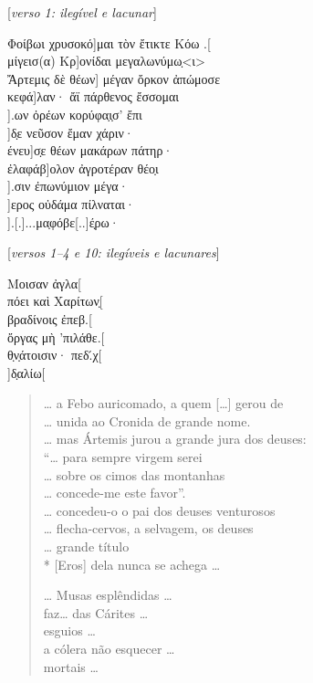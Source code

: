 \begin{gkverse}
\textnormal{[\textit{verso 1: ilegível e lacunar}]}

Φοίβωι χρυσοκό]μαι τὸν ἔτικτε Κόω .[\\
μίγεισ(α)         Κρ]ονίδαι μεγαλωνύμω̣<ι>\\
Ἄρτεμις δὲ θέων] μέγαν ὄρκον ἀπώμοσε\\
    κεφά]λαν· ἄϊ πάρθενος ἔσσομαι\\
             ].ων ὀρέων κορύφα̣ι̣σ’ ἔπι\\
    ]δ̣ε νεῦσον ἔμαν χάριν·\\
         ένευ]σ̣ε θέων μακάρων πάτηρ·\\
ἐλαφάβ]ολον ἀγροτέραν θέο̣ι\\
            ].σιν ἐπωνύμιον μέγα·\\
   ]ερος οὐδάμα πίλναται·\\
     ].[.]...μα̣φόβε[..]έ̣ρω·

\textnormal{[\textit{versos 1--4 e 10: ilegíveis e lacunares}]}

Μοισαν ἀγλα[\\
πόει καὶ Χαρίτων̣[\\
βραδίνοις ἐπεβ.[\\
ὄργας μὴ ’πιλάθε.[\\
θ̣ν̣άτοισιν· πεδ.́χ[\\
      ]δ̣αλίω[
\end{gkverse}
\pagebreak
\begin{verse}
\ldots{} a Febo auricomado, a quem [\ldots{}] gerou de \\
\ldots{} unida ao Cronida de grande nome.\\
\ldots{} mas Ártemis jurou a grande jura dos deuses:\\
``\ldots{} para sempre virgem serei\\
\ldots{} sobre os cimos das montanhas\\
\ldots{} concede-me este favor''.\\
\ldots{} concedeu-o o pai dos deuses venturosos\\
\ldots{} flecha-cervos, a selvagem, os deuses\\
\ldots{} grande título\\*
[Eros] dela nunca se achega \ldots{}

\hspace*{16mm}

\ldots{} Musas esplêndidas \ldots{}\\
faz\ldots{} das Cárites \ldots{}\\
esguios \ldots{}\\
a cólera não esquecer \ldots{}\\
mortais \ldots{}
\end{verse}

